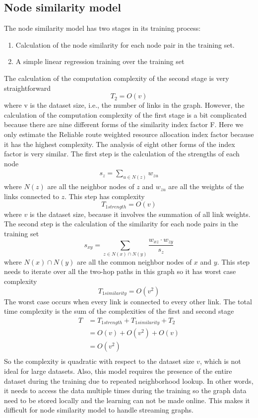\documentclass[12pt]{WSUThesis}
\theoremstyle{definition}
\begin{document}
\subsection{Node similarity model}
The node similarity model has two stages in its training process:
\begin{enumerate}
	\item Calculation of the node similarity for each node pair in the training set.
	\item A simple linear regression training over the training set
\end{enumerate}
The calculation of the computation complexity of the second stage is very straightforward
\[T_2 = O(v)\]
where v is the dataset size, i.e., the number of links in the graph. However, the calculation of the computation complexity of the first stage is a bit complicated because there are nine different forms of the similarity index factor F. Here we only estimate the Reliable route weighted resource allocation index factor because it has the highest complexity. The analysis of eight other forms of the index factor is very similar.
The first step is the calculation of the strengths of each node
\begin{align*}
	s_z = \sum_{u \in N(z)} w_{zu}
\end{align*}
where $ N(z) $ are all the neighbor nodes of $ z $ and $ w_{zu} $ are all the weights of the links connected to $ z $. This step has complexity
\[T_{1strength} = O(v)\]
where $ v $ is the dataset size, because it involves the summation of all link weights.
The second step is the calculation of the similarity for each node pairs in the training set
\[s_{xy} = \sum_{z \in N(x) \cap N(y)} \frac{w_{xz} \cdot w_{zy}}{s_z}\]
where $ N(x) \cap N(y) $ are all the common neighbor nodes of $ x $ and $ y $. This step needs to iterate over all the two-hop paths in this graph so it has worst case complexity
\[T_{1similarity} = O(v^2)\]
The worst case occurs when every link is connected to every other link.
The total time complexity is the sum of the complexities of the first and second stage
\begin{align*}
	T
	&= T_{1strength} + T_{1similarity} + T_2 \\
	&= O(v) + O(v^2) + O(v) \\
	&= O(v^2) \\
\end{align*}
So the complexity is quadratic with respect to the dataset size $ v $, which is not ideal for large datasets.
Also, this model requires the presence of the entire dataset during the training due to repeated neighborhood lookup.
In other words, it needs to access the data multiple times during the training so the graph data need to be stored locally and the learning can not be made online.
This makes it difficult for node similarity model to handle streaming graphs.
\end{document}
